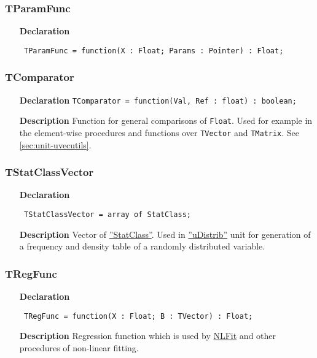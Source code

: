 \documentclass[12pt,a4paper,oneside]{report}
\newcommand{\lmath}[1]{   %
	\marginpar{\vspace{#1} 
		\begin{flushright}
			LMath
	\end{flushright} }
}
\newcommand{\lmatha}[1]{   %
	\marginpar{\vspace{#1} 
		\begin{flushright}
			LMath 0.5
	\end{flushright} }
}
\newcommand{\declarationitem}[1]{\textbf{#1}}
\newcommand{\descriptiontitle}[1]{\textbf{#1}}
\newcommand{\code}[1]{\texttt{#1}}
\begin{document}
\subsubsection{TParamFunc}
\lmath{-24pt}
\label{utypes-TParamFunc}
\begin{itemize}\item[\declarationitem{Declaration}\hfill]
	\begin{flushleft}
		\code{
			TParamFunc = function(X : Float; Params : Pointer) : Float;}
	\end{flushleft}
\end{itemize}
\subsubsection{TComparator}
\label{utypes-TComparator}
\lmatha{-24pt}
\begin{itemize}
	\item[\declarationitem{Declaration}\hfill]
	\code{TComparator = function(Val, Ref : float) : boolean;}
	\item[\descriptiontitle{Description}]Function for general comparisons of \code{Float}. Used for example in the element-wise procedures and functions over \code{TVector} and \code{TMatrix}. See \ref{sec:unit-uvecutils}.
\end{itemize}
\subsubsection{TStatClassVector}
\label{utypes-TStatClassVector}
\begin{itemize}
	\item[\declarationitem{Declaration}\hfill]
	\begin{flushleft}
		\code{
			TStatClassVector = array of StatClass;}
	\end{flushleft}
	\item[\descriptiontitle{Description}]
Vector of \hyperref[sec:statclass]{''StatClass''}. Used in \hyperref[udistrib]{''uDistrib''} unit for generation of a frequency and density table of a randomly distributed variable.
\end{itemize}

\subsubsection{TRegFunc}
\label{utypes-TRegFunc}
\begin{itemize}\item[\declarationitem{Declaration}\hfill]
	\begin{flushleft}
		\code{
			TRegFunc = function(X : Float; B : TVector) : Float;}
	\end{flushleft}
	\item[\descriptiontitle{Description}]
	Regression function which is used by \hyperref[unlfit-NLFit]{NLFit} and other procedures of non-linear fitting.
\end{itemize}
\end{document}
